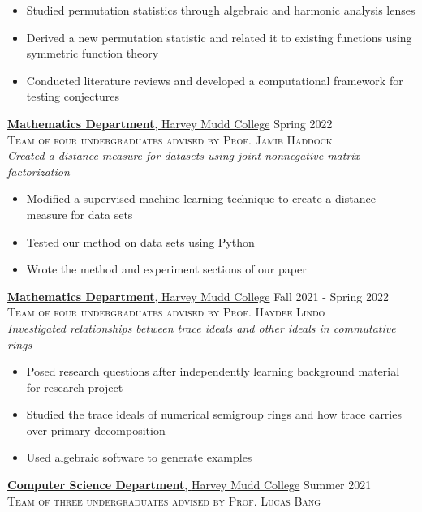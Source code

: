 \documentclass[11pt]{article}
\newcommand{\role}[3]{\underline{\textbf{#1}, {#2}} \hfill #3}
\begin{document}
\begin{itemize}
  \item Studied permutation statistics through algebraic and harmonic analysis lenses
  \item Derived a new permutation statistic and related it to existing functions using symmetric function theory
  \item Conducted literature reviews and developed a computational framework for testing conjectures
\end{itemize}
\smallskip
\role{Mathematics Department}{Harvey Mudd College}{Spring 2022}\\
\textsc{Team of four undergraduates advised by Prof. Jamie Haddock}\\
\textit{Created a distance measure for datasets  using joint nonnegative matrix factorization}
\begin{itemize}
\item Modified a supervised machine learning technique to create a distance measure for data sets
\item Tested our method on data sets using Python
\item Wrote the method and experiment sections of our paper
\end{itemize}
\smallskip
\role{Mathematics Department}{Harvey Mudd College}{Fall 2021 - Spring 2022}\\
\textsc{Team of four undergraduates advised by Prof. Haydee Lindo}\\
\textit{Investigated relationships between trace ideals and other ideals in commutative rings}
\begin{itemize}
  \item Posed research questions after independently learning background material for research project
  \item Studied the trace ideals of numerical semigroup rings and how trace carries over primary decomposition
  \item Used algebraic software to generate examples
\end{itemize}
\smallskip
\role{Computer Science Department}{Harvey Mudd College}{Summer 2021}\\
\textsc{Team of three undergraduates advised by Prof. Lucas Bang}\\
\end{document}
